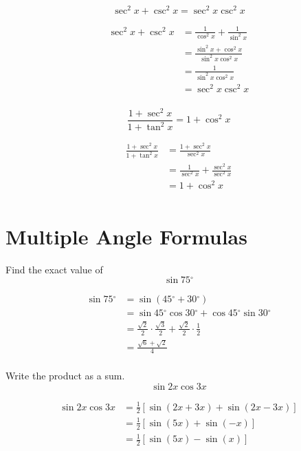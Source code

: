 \documentclass[fleqn,addpoints]{exam}
\newcommand{\degree}{\ensuremath{^\circ}}
\begin{document}
\begin{questions}
\question[5]
\[
  \sec^2x + \csc^2 x = \sec^2 x \csc^2 x 
\]
\begin{solution}[3 cm]
\begin{align*}
  \sec^2x + \csc^2 x &= \frac{1}{\cos^2 x} + \frac{1}{\sin^2 x} \\
  &= \frac{\sin^2 x + \cos^2 x}{\sin^2 x \cos^2 x} \\
  &= \frac{1}{\sin^2 x \cos^2 x} \\
  &= \sec^2 x \csc^2 x \\
\end{align*}
\end{solution}

\question[5]
\label{identity:last}
\[
  \frac{1 + \sec^2 x}{1 + \tan^2 x} = 1 + \cos^2 x
\]
\begin{solution}[3 cm]
\begin{align*}
  \frac{1 + \sec^2 x}{1 + \tan^2 x} &= \frac{1 + \sec^2 x}{\sec^2 x} \\
  &= \frac{1}{\sec^2 x} + \frac{\sec^2 x}{\sec^2 x} \\
  &= 1 + \cos^2 x \\
\end{align*}
\end{solution}

\section{Multiple Angle Formulas}

Find the exact value of
\question[5]
\[
  \sin 75 \degree  
\]
\begin{solution}[4 cm]
\begin{align*}
  \sin 75 \degree &= \sin(45 \degree + 30 \degree) \\
  &= \sin 45 \degree \cos 30 \degree + \cos 45 \degree \sin 30 \degree \\
  &= \frac{\sqrt{2}}{2} \cdot \frac{\sqrt{3}}{2} + \frac{\sqrt{2}}{2} \cdot \frac{1}{2} \\
  &= \frac{\sqrt{6} + \sqrt{2}}{4} \\
\end{align*}
\end{solution}

\question[5]
Write the product as a sum. 
\[
  \sin 2x \cos 3x
\]
\begin{solution}[4 cm]
\begin{align*}
  \sin 2x \cos 3x &= \frac{1}{2} \left[ \sin(2x + 3x) + \sin(2x - 3x) \right] \\
  &= \frac{1}{2} \left[ \sin(5x) + \sin(-x) \right] \\
  &= \frac{1}{2} \left[ \sin(5x) - \sin(x) \right] \\
\end{align*}
\end{solution}


\end{questions}
\end{document}
